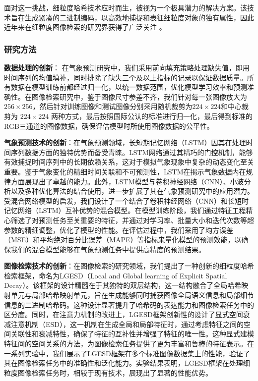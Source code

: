 面对这一挑战，细粒度哈希技术应时而生，被视为一个极具潜力的解决方案。该技术旨在生成紧凑的二进制编码，以高效地捕捉和表征细粒度对象的独有属性，因此近年来在细粒度图像检索的研究界获得了广泛关注 \cite{solving9157668}\cite{Zeng_2024}\cite{DSH9037360}。

\subsubsection{研究方法}

\textbf{数据处理的创新}：
在气象预测研究中，我们采用前向填充策略处理缺失值，即用时间序列的均值填补，同时排除了缺失三个及以上指标的记录以保证数据质量。所有数据在模型训练前都经过归一化，以统一数据范围，优化模型学习效率和预测准确性。在图像检索研究中，鉴于图像尺寸参差不齐，我们针对每一张图像放大为 $256 \times 256$，然后针对训练图像和测试图像分别采用随机裁剪为$224 \times 224$和中心裁剪为 $224 \times 224$ 两种方式，最后按照国际公认的标准进行归一化，最后得到标准的RGB三通道的图像数据，确保评估模型时所使用图像数据的公平性。

\textbf{气象预测技术的创新}：在气象预测领域，长短期记忆网络（LSTM）因其在处理时间序列数据方面的独特优势而备受青睐。LSTM网络通过其精巧的门控机制，能够有效捕捉时间序列中的长期依赖关系，这对于模拟气象现象中复杂的动态变化至关重要。鉴于气象变化的精细时间关联和不可预测性，LSTM在揭示气象数据内在规律方面展现出了卓越的能力。此外，LSTM模型与卷积神经网络（CNN）、小波分析以及多种优化算法的结合使用\cite{HJKZ2024011600J}\cite{JYGC20240415002}\cite{HBYD202401011}\cite{DLJS202401002}，进一步扩展了其在气象预测研究中的应用潜力。受混合网络模型的启发，我们设计了一个结合了卷积神经网络（CNN）和长短时记忆网络（LSTM）互补优势的混合模型。在模型训练阶段，我们通过特征工程精心筛选了对预测任务至关重要的特征，并通过对学习率、批量大小和迭代次数等超参数的精细调整，优化了模型的性能。在评估过程中，我们采用了均方误差（MSE）和平均绝对百分比误差（MAPE）等指标来量化模型的预测效能，以确保我们的混合模型能够在气象预测任务中提供高精度的预测结果。

\textbf{图像检索技术的创新}：在图像检索的研究领域，我们提出了一种创新的细粒度哈希检索框架，命名为LGESD（Local and Global learning of Explicit Spatial Decay）。该框架的设计精髓在于其独特的双层结构，这一结构融合了全局哈希映射单元与局部哈希映射单元，旨在生成能够同时捕获图像全局语义信息和局部细节信息的二进制哈希码。这种设计显著提升了哈希码的表达能力和图像检索任务中的区分度。同时，在注意力机制的改进上，LGESD框架创新性的设计了显式空间衰减注意机制（ESD），这一机制在生成全局和局部特征时，通过考虑特征之间的空间关联性和衰减特性，确保了特征的互补性并增强了特征的唯一性。这种显式建模特征间的空间关系的方法，为图像检索任务提供了更为丰富和鲁棒的特征表示。在一系列实验中，我们展示了LGESD框架在多个标准图像数据集上的性能，验证了其在图像检索任务中的准确性和泛化能力。实验结果表明，LGESD框架在处理细粒度图像检索任务时，相较于现有技术，展现出了显著的性能优势。




